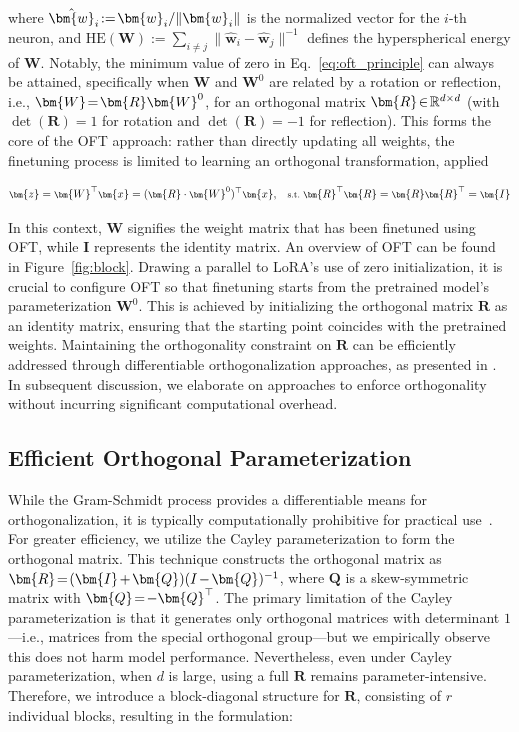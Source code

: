 where $\thickmuskip=2mu \medmuskip=2mu \hat{\bm{w}}_i:=\bm{w}_i/\|\bm{w}_i\|$ is the normalized vector for the $i$-th neuron, and $\text{HE}(\bm{W}):= \sum_{i\neq j} \|\hat{\bm{w}}_i-\hat{\bm{w}}_j\|^{-1}$ defines the hyperspherical energy of $\bm{W}$. Notably, the minimum value of zero in Eq.~\eqref{eq:oft_principle} can always be attained, specifically when $\bm{W}$ and $\bm{W}^0$ are related by a rotation or reflection, i.e., $\thickmuskip=2mu \medmuskip=2mu \bm{W}=\bm{R}\bm{W}^0$, for an orthogonal matrix $\thickmuskip=2mu \medmuskip=2mu \bm{R}\in\mathbb{R}^{d\times d}$ (with $\det(\bm{R}) = 1$ for rotation and $\det(\bm{R}) = -1$ for reflection). This forms the core of the OFT approach: rather than directly updating all weights, the finetuning process is limited to learning an orthogonal transformation, applied

\begin{equation}\label{eq:oft_general}
    \footnotesize
    \bm{z}=\bm{W}^\top\bm{x}=(\bm{R}\cdot\bm{W}^0)^\top\bm{x},~~~\text{s.t.}~\bm{R}^\top\bm{R}=\bm{R}\bm{R}^\top=\bm{I}
\end{equation}

In this context, $\bm{W}$ signifies the weight matrix that has been finetuned using OFT, while $\bm{I}$ represents the identity matrix. An overview of OFT can be found in Figure~\ref{fig:block}. Drawing a parallel to LoRA’s use of zero initialization, it is crucial to configure OFT so that finetuning starts from the pretrained model’s parameterization $\bm{W}^0$. This is achieved by initializing the orthogonal matrix $\bm{R}$ as an identity matrix, ensuring that the starting point coincides with the pretrained weights. Maintaining the orthogonality constraint on $\bm{R}$ can be efficiently addressed through differentiable orthogonalization approaches, as presented in \cite{liu2021orthogonal,lezcano2019cheap}. In subsequent discussion, we elaborate on approaches to enforce orthogonality without incurring significant computational overhead.

\subsection{Efficient Orthogonal Parameterization}\label{sect:eff_ortho}

While the Gram-Schmidt process provides a differentiable means for orthogonalization, it is typically computationally prohibitive for practical use~\cite{liu2021orthogonal}. For greater efficiency, we utilize the Cayley parameterization to form the orthogonal matrix. This technique constructs the orthogonal matrix as $\thickmuskip=2mu \medmuskip=2mu \bm{R}=(\bm{I}+\bm{Q})(I-\bm{Q})^{-1}$, where $\bm{Q}$ is a skew-symmetric matrix with $\thickmuskip=2mu \medmuskip=2mu \bm{Q}=-\bm{Q}^\top$. The primary limitation of the Cayley parameterization is that it generates only orthogonal matrices with determinant $1$—i.e., matrices from the special orthogonal group—but we empirically observe this does not harm model performance. Nevertheless, even under Cayley parameterization, when $d$ is large, using a full $\bm{R}$ remains parameter-intensive. Therefore, we introduce a block-diagonal structure for $\bm{R}$, consisting of $r$ individual blocks, resulting in the formulation:

